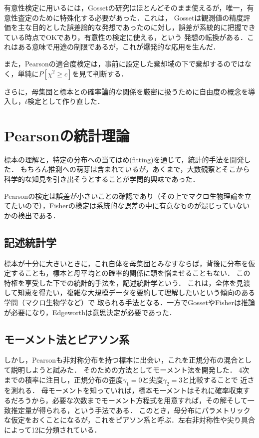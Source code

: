\documentclass[uplatex,dvipdfmx]{jsreport}
\begin{document}
有意性検定に用いるには，Gossetの研究はほとんどそのまま使えるが，唯一，有意性査定のために特殊化する必要があった．これは，
Gossetは観測値の精度評価を主な目的とした誤差論的な発想であったのに対し，誤差が系統的に把握できている時点でOKであり，有意性の検定に使える，という
発想の転換がある．これはある意味で用途の制限であるが，これが爆発的な応用を生んだ．

また，Pearsonの適合度検定は，事前に設定した棄却域の下で棄却するのではなく，単純に$P[\chi^2\ge c]$を見て判断する．


さらに，母集団と標本との確率論的な関係を厳密に扱うために自由度の概念を導入し，$t$検定として作り直した．

\section{Pearsonの統計理論}

\begin{tcolorbox}[colframe=ForestGreen, colback=ForestGreen!10!white,breakable,colbacktitle=ForestGreen!40!white,coltitle=black,fonttitle=\bfseries\sffamily,
title=]
    標本の理解と，特定の分布への当てはめ(fitting)を通じて，統計的手法を開発した．
    もちろん推測への萌芽は含まれているが，あくまで，大数観察とそこから科学的な知見を引き出そうとすることが学問的興味であった．

    Pearsonの検定は誤差が小さいことの確認であり（その上でマクロ生物理論を立てたいので），Fisherの検定は系統的な誤差の中に有意なものが混じっていないかの検出である．
\end{tcolorbox}

\subsection{記述統計学}

標本が十分に大きいときに，これ自体を母集団とみなすならば，背後に分布を仮定することも，標本と母平均との確率的関係に頭を悩ませることもない．
この特権を享受した下での統計的手法を，記述統計学という．
これは，全体を見渡して知恵を得たい，複雑な大規模データを要約して理解したいという傾向のある学問（マクロ生物学など）で
取られる手法となる．一方でGossetやFisherは推論が必要になり，Edgeworthは意思決定が必要であった．

\subsection{モーメント法とピアソン系}

しかし，Pearsonも非対称分布を持つ標本に出会い，これを正規分布の混合として説明しようと試みた．
そのための方法としてモーメント法を開発した．
4次までの積率に注目し，正規分布の歪度$\gamma_1=0$と尖度$\gamma_2=3$と比較することで
近さを測れる．
母モーメントを知っていれば，標本モーメントはそれに確率収束するだろうから，必要な次数までモーメント方程式を用意すれば，その解そして一致推定量が得られる，という手法である．
このとき，母分布にパラメトリックな仮定をおくことになるが，これをピアソン系と呼ぶ．左右非対称性や尖り具合によって12に分類されている．
\end{document}
